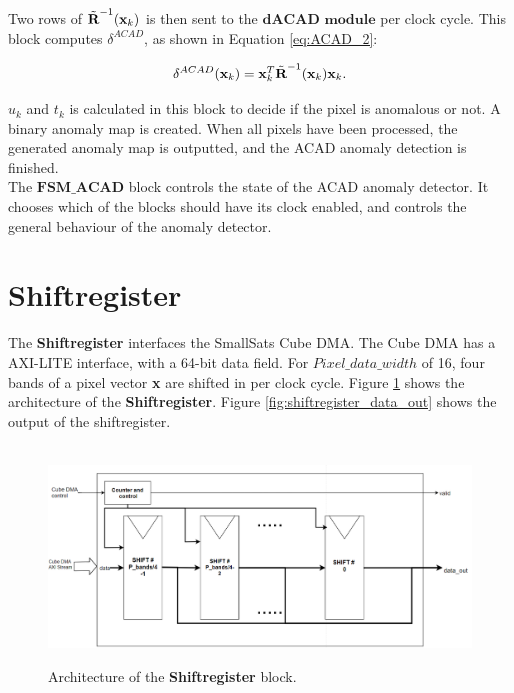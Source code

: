 Two rows of $\Tilde{\textbf{R}}^{-1}(\textbf{x}_k)$ is then sent to the $\textbf{dACAD module}$ per clock cycle. This block computes $\delta^{ACAD}$, as shown in Equation \ref{eq:ACAD_2}: 


\begin{equation}
    \delta^{ACAD}(\textbf{x}_k)= \textbf{x}_k^T\Tilde{\textbf{R}}^{-1}(\textbf{x}_k)\textbf{x}_k.
    \label{eq:ACAD_2}
\end{equation}

$u_k$ and $t_k$ is calculated in this block to decide if the pixel is anomalous or not. A binary anomaly map is created. When all pixels have been processed, the generated anomaly map is outputted, and the ACAD anomaly detection is finished.   
\\

The $\textbf{FSM\_ACAD}$ block controls the state of the ACAD anomaly detector. It chooses which of the blocks should have its clock enabled, and controls the general behaviour of the anomaly detector. 







\section{Shiftregister}
The \textbf{Shiftregister} interfaces the SmallSats Cube DMA. The Cube DMA has a AXI-LITE interface, with a 64-bit data field. For $Pixel\_data\_width$ of 16, four bands of a pixel vector \textbf{x} are shifted in per clock cycle. Figure \ref{fig:shiftregister_architecture} shows the architecture of the \textbf{Shiftregister}. Figure \ref{fig:shiftregister_data_out} shows the output of the shiftregister. 

\begin{figure}[H]
\centering
\hbox{\hspace*{-1.2cm}             
   \includegraphics[scale=0.5]{images/shiftregister.png}}
  \caption{Architecture of the \textbf{Shiftregister} block. } 
  \label{fig:shiftregister_architecture}
\end{figure}


